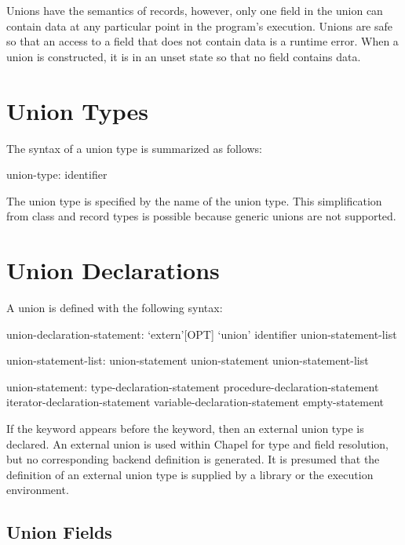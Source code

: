 \label{Unions}

Unions have the semantics of records, however, only one field in the
union can contain data at any particular point in the program's
execution.  Unions are safe so that an access to a field that does not
contain data is a runtime error.  When a union is constructed, it is
in an unset state so that no field contains data.

\section{Union Types}
\label{Union_Types}

The syntax of a union type is summarized as follows:
\begin{syntax}
union-type:
  identifier
\end{syntax}
The union type is specified by the name of the union type.  This
simplification from class and record types is possible because generic
unions are not supported.

\section{Union Declarations}
\label{Union_Declarations}

A union is defined with the following syntax:
\begin{syntax}
union-declaration-statement:
  `extern'[OPT] `union' identifier { union-statement-list }

union-statement-list:
  union-statement
  union-statement union-statement-list

union-statement:
  type-declaration-statement
  procedure-declaration-statement
  iterator-declaration-statement
  variable-declaration-statement
  empty-statement
\end{syntax}

If the  keyword appears before the  keyword, then an
external union type is declared.  An external union is used within Chapel
for type and field resolution, but no corresponding backend definition is
generated.  It is presumed that the definition of an external union type is supplied
by a library or the execution environment.

\subsection{Union Fields}
\label{Union_Fields}

